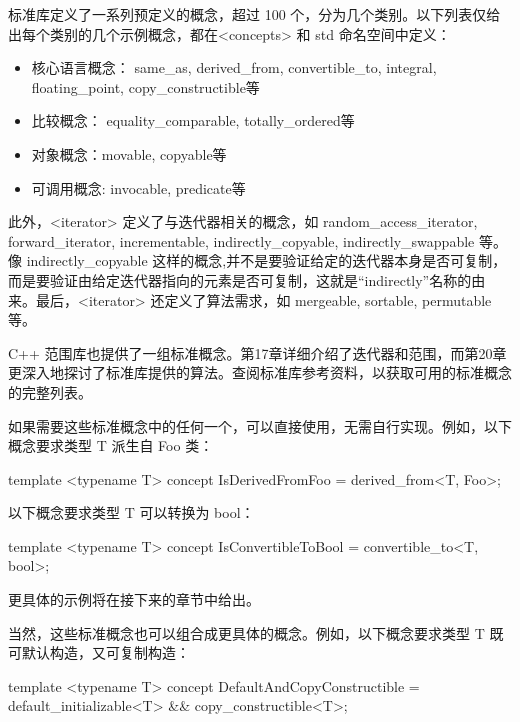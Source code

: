 
标准库定义了一系列预定义的概念，超过 100 个，分为几个类别。以下列表仅给出每个类别的几个示例概念，都在<concepts>  和 std 命名空间中定义：

\begin{itemize}
\item
核心语言概念： same\_as, derived\_from, convertible\_to, integral, floating\_point, copy\_constructible等

\item
比较概念： equality\_comparable, totally\_ordered等

\item
对象概念：movable, copyable等

\item
可调用概念: invocable, predicate等
\end{itemize}

此外，<iterator> 定义了与迭代器相关的概念，如 random\_access\_iterator, forward\_iterator, incrementable, indirectly\_copyable, indirectly\_swappable 等。像 indirectly\_copyable 这样的概念,并不是要验证给定的迭代器本身是否可复制，而是要验证由给定迭代器指向的元素是否可复制，这就是“indirectly”名称的由来。最后，<iterator> 还定义了算法需求，如 mergeable, sortable, permutable 等。

C++ 范围库也提供了一组标准概念。第17章详细介绍了迭代器和范围，而第20章更深入地探讨了标准库提供的算法。查阅标准库参考资料，以获取可用的标准概念的完整列表。

如果需要这些标准概念中的任何一个，可以直接使用，无需自行实现。例如，以下概念要求类型 T 派生自 Foo 类：

\begin{cpp}
template <typename T>
concept IsDerivedFromFoo = derived_from<T, Foo>;
\end{cpp}

以下概念要求类型 T 可以转换为 bool：

\begin{cpp}
template <typename T>
concept IsConvertibleToBool = convertible_to<T, bool>;
\end{cpp}

更具体的示例将在接下来的章节中给出。

当然，这些标准概念也可以组合成更具体的概念。例如，以下概念要求类型 T 既可默认构造，又可复制构造：

\begin{cpp}
template <typename T>
concept DefaultAndCopyConstructible =
    default_initializable<T> && copy_constructible<T>;
\end{cpp}

